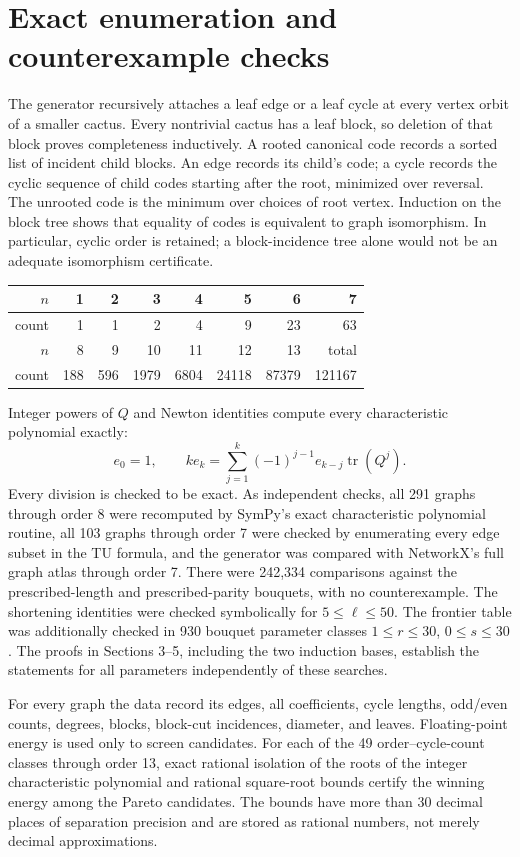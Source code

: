 \documentclass[12pt]{amsart}
\theoremstyle{definition}
\theoremstyle{remark}
\numberwithin{equation}{section}
\DeclareMathOperator{\tr}{tr}
\begin{document}
\section{Exact enumeration and counterexample checks}
The generator recursively attaches a leaf edge or a leaf cycle at every
vertex orbit of a smaller cactus. Every nontrivial cactus has a leaf block,
so deletion of that block proves completeness inductively. A rooted
canonical code records a sorted list of incident child blocks. An edge
records its child's code; a cycle records the cyclic sequence of child
codes starting after the root, minimized over reversal. The unrooted code
is the minimum over choices of root vertex. Induction on the block tree
shows that equality of codes is equivalent to graph isomorphism. In
particular, cyclic order is retained; a block-incidence tree alone would
not be an adequate isomorphism certificate.

\begin{center}
\begin{tabular}{r|rrrrrrr}
$n$&1&2&3&4&5&6&7\\\hline
count&1&1&2&4&9&23&63\\[3pt]
$n$&8&9&10&11&12&13&total\\\hline
count&188&596&1979&6804&24118&87379&121167
\end{tabular}
\end{center}

Integer powers of $Q$ and Newton identities compute every characteristic
polynomial exactly:
\[
 e_0=1,\qquad
 k e_k=\sum_{j=1}^k(-1)^{j-1}e_{k-j}\tr(Q^j).
\]
Every division is checked to be exact. As independent checks, all 291
graphs through order 8 were recomputed by SymPy's exact characteristic
polynomial routine, all 103 graphs through order 7 were checked by
enumerating every edge subset in the TU formula, and the generator was
compared with NetworkX's full graph atlas through order 7.
There were 242,334 comparisons against the prescribed-length and
prescribed-parity bouquets, with no counterexample. The shortening
identities were checked symbolically for $5\le\ell\le50$.
The frontier table was additionally checked in 930 bouquet parameter
classes $1\le r\le30$, $0\le s\le30$. The proofs in Sections 3--5,
including the two induction bases, establish the statements for all
parameters independently of these searches.

For every graph the data record its edges, all coefficients, cycle lengths,
odd/even counts, degrees, blocks, block-cut incidences, diameter, and leaves.
Floating-point energy is used only to screen candidates. For each of the
49 order--cycle-count classes through order 13, exact rational isolation of
the roots of the integer characteristic polynomial and rational square-root
bounds certify the winning energy among the Pareto candidates. The bounds
have more than 30 decimal places of separation precision and are stored as
rational numbers, not merely decimal approximations.
\end{document}
